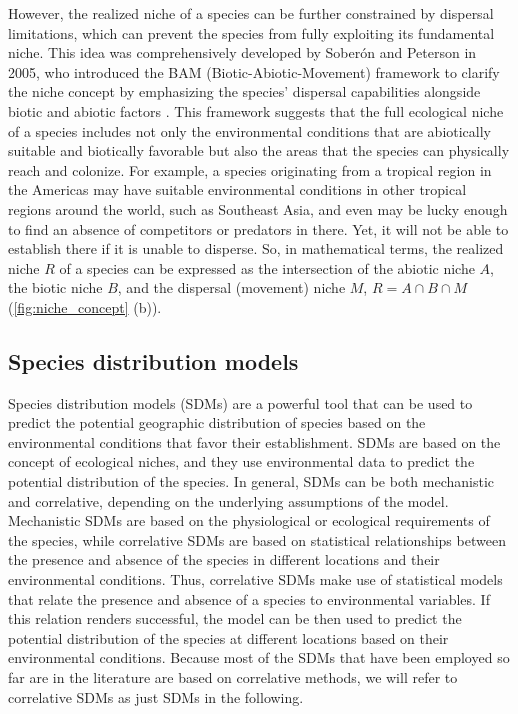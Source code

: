 However, the realized niche of a species can be further constrained by
dispersal limitations, which can prevent the species from fully exploiting its
fundamental niche. This idea was comprehensively developed by Soberón and
Peterson in 2005, who introduced the BAM (Biotic-Abiotic-Movement) framework to
clarify the niche concept by emphasizing the species' dispersal capabilities
alongside biotic and abiotic factors \cite{Soberon2005}. This framework
suggests that the full ecological niche of a species includes not only the
environmental conditions that are abiotically suitable and biotically favorable
but also the areas that the species can physically reach and colonize. For
example, a species originating from a tropical region in the Americas may have
suitable environmental conditions in other tropical regions around the world,
such as Southeast Asia, and even may be lucky enough to find an absence of
competitors or predators in there. Yet, it will not be able to establish there
if it is unable to disperse. So, in mathematical terms, the realized niche $R$
of a species can be expressed as the intersection of the abiotic niche $A$, the
biotic niche $B$, and the dispersal (movement) niche $M$, $R=A\cap B\cap M$
(\cref{fig:niche_concept} (b)).

\subsection{\label{sec:Species distribution models} Species distribution
  models}

Species distribution models (SDMs) are a powerful tool that can be used to
predict the potential geographic distribution of species based on the
environmental conditions that favor their establishment. SDMs are based on the
concept of ecological niches, and they use environmental data to predict the
potential distribution of the species. In general, SDMs can be both mechanistic
and correlative, depending on the underlying assumptions of the model.
Mechanistic SDMs are based on the physiological or ecological requirements of
the species, while correlative SDMs are based on statistical relationships
between the presence and absence of the species in different locations and
their environmental conditions. Thus, correlative SDMs make use of statistical
models that relate the presence and absence of a species to environmental
variables. If this relation renders successful, the model can be then used to
predict the potential distribution of the species at different locations based
on their environmental conditions. Because most of the SDMs that have been
employed so far are in the literature are based on correlative methods, we will
refer to correlative SDMs as just SDMs in the following.

